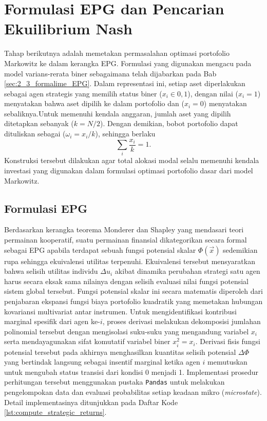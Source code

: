 \section{Formulasi EPG dan Pencarian Ekuilibrium Nash}
\label{sec:4_2_epg_nash}
Tahap berikutnya adalah memetakan permasalahan optimasi portofolio Markowitz ke dalam kerangka EPG. Formulasi yang digunakan mengacu pada model varians-rerata biner sebagaimana telah dijabarkan pada Bab \ref{sec:2_3_formalime_EPG}. Dalam representasi ini, setiap aset diperlakukan sebagai agen strategis yang memilih status biner ($x_i \in {0,1}$), dengan nilai ($x_i=1$) menyatakan bahwa aset dipilih ke dalam portofolio dan ($x_i=0$) menyatakan sebaliknya.Untuk memenuhi kendala anggaran, jumlah aset yang dipilih ditetapkan sebanyak ($k=N/2$). Dengan demikian, bobot portofolio dapat dituliskan sebagai ($\omega_i=x_i/k$), sehingga berlaku
\begin{equation}
    \sum_i \frac{x_i}{k} = 1.
\end{equation}
Konstruksi tersebut dilakukan agar total alokasi modal selalu memenuhi kendala investasi yang digunakan dalam formulasi optimasi portofolio dasar dari model Markowitz.

\subsection{Formulasi EPG}
Berdasarkan kerangka teorema Monderer dan Shapley yang mendasari teori permainan kooperatif, suatu permainan finansial dikategorikan secara formal sebagai EPG apabila terdapat sebuah fungsi potensial skalar $\Phi(\vec{x})$ sedemikian rupa sehingga ekuivalensi utilitas terpenuhi. Ekuivalensi tersebut mensyaratkan bahwa selisih utilitas individu $\Delta u_i$ akibat dinamika perubahan strategi satu agen harus secara eksak sama nilainya dengan selisih evaluasi nilai fungsi potensial sistem global tersebut. Fungsi potensial skalar ini secara matematis diperoleh dari penjabaran ekspansi fungsi biaya portofolio kuadratik yang memetakan hubungan kovariansi multivariat antar instrumen. Untuk mengidentifikasi kontribusi marginal spesifik dari agen ke-$i$, proses derivasi melakukan dekomposisi jumlahan polinomial tersebut dengan mengisolasi suku-suku yang mengandung variabel $x_i$ serta mendayagunakan sifat komutatif variabel biner $x_i^2 = x_i$. Derivasi fisis fungsi potensial tersebut pada akhirnya menghasilkan kuantitas selisih potensial $\Delta \Phi$ yang bertindak langsung sebagai insentif marginal ketika agen $i$ memutuskan untuk mengubah status transisi dari kondisi 0 menjadi 1. Implementasi prosedur perhitungan tersebut menggunakan pustaka \texttt{Pandas} untuk melakukan pengelompokan data dan evaluasi probabilitas setiap keadaan mikro (\textit{microstate}). Detail implementasinya ditunjukkan pada Daftar Kode \ref{lst:compute_strategic_returns}.

